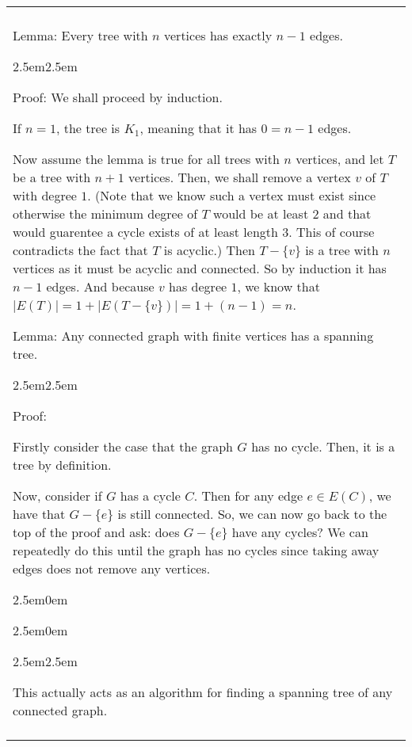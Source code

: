 \documentclass{book}
\newcommand{\hTwoOldd}{%
   \color{MidnightBlue}%
   \fontsize{13}{13}\selectfont%
}
\newcommand{\hThreeOld}{%
   \color{PineGreen}
   \fontsize{13}{13}\selectfont%
}
\newcommand{\teachCommentOldd}{
   \color{Orange}%
   \fontsize{12}{12}\selectfont%
}
\newenvironment{myIndent}{%
   \begin{adjustwidth}{2.5em}{0em}%
}{%
   \end{adjustwidth}%
}
\newenvironment{myConstrict}{%
   \begin{adjustwidth}{2.5em}{2.5em}%
}{%
   \end{adjustwidth}%
}
\newcommand{\uuline}[2][.]{%
{\vphantom{a}\color{#1}%
\rlap{\rule[-0.18em]{\widthof{#2}}{0.06em}}%
\rlap{\rule[-0.32em]{\widthof{#2}}{0.06em}}}%
#2}
\newenvironment{myClosureOne}[2][.]{%
   \color{#1}%
   \begin{tabular}{|p{#2in}|} \hline \\%
}{%
   \\ \\ \hline \end{tabular}%
}
\newcommand{\retTwo}{\hfill\bigbreak}
\begin{document}
   \begin{center}
      \begin{myClosureOne}{5.5}
         \uuline{Lemma}: Every tree with $n$ vertices has exactly
         $n - 1$ edges.
         \hThreeOld
         \begin{myConstrict}
            Proof: We shall proceed by induction. \retTwo
            
            If $n = 1$, the tree is $K_1$, meaning that it has $0=n-1$
            edges. \retTwo

            Now assume the lemma is true for all trees with $n$
            vertices, and let $T$ be a tree with $n+1$ vertices. Then,
            we shall remove a vertex $v$ of $T$ with degree $1$. 
            (Note that we know such a vertex must exist since 
            otherwise the minimum degree of $T$ would be 
            at least $2$ and that would guarentee a cycle exists 
            of at least length 3. This
            of course contradicts the fact that $T$ is acyclic.)
            \retTwo 
            Then $T - \{v\}$ is a tree with $n$ vertices as it must be acyclic and connected. 
            So by induction it has $n-1$ edges. And because
            $v$ has degree $1$, we know that \newline $\lvert E(T) \rvert
            = 1 + \lvert E(T - \{v\}) \rvert = 1 + (n - 1) = n$.
         \end{myConstrict} \retTwo
         \hTwoOldd

         \uuline{Lemma}: Any connected graph with finite vertices has a spanning tree.
         \hThreeOld
         \begin{myConstrict}
            Proof: \retTwo

            Firstly consider the case that the graph $G$ has no cycle.
            Then, it is a tree by definition. \retTwo

            Now, consider if $G$ has a cycle $C$. Then for any edge \newline
            $e \in E(C)$, we have that $G - \{e\}$ is still connected.
            So, we can now go back to the top of the proof and ask:
            does $G -\{e\}$ have any cycles? We can repeatedly do this
            until the graph has no cycles since taking away edges
            does not remove any vertices.
            
         \end{myConstrict}
         \teachCommentOldd
         \begin{myIndent}\begin{myIndent}
            \begin{myConstrict}
            This actually acts as an algorithm for finding a spanning
            tree of any connected graph.
            \end{myConstrict}
         \end{myIndent}\end{myIndent}
      \end{myClosureOne}
   \end{center}\retTwo
\end{document}
